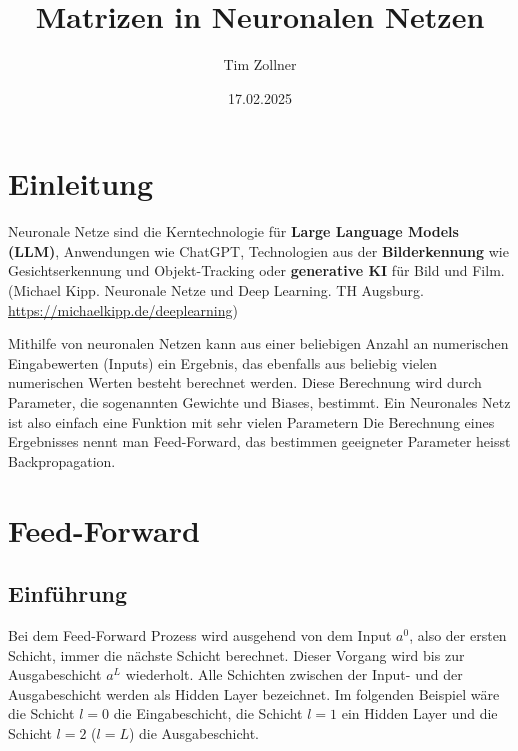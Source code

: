 \documentclass{article}
\begin{document}
\title{Matrizen in Neuronalen Netzen}
\author{Tim Zollner}
\date{17.02.2025}
\maketitle

\newpage

\section{Einleitung}
\glqq Neuronale Netze sind die Kerntechnologie für \textbf{Large Language Models (LLM)}, Anwendungen wie ChatGPT, Technologien aus der \textbf{Bilderkennung} wie Gesichtserkennung und Objekt-Tracking oder \textbf{generative KI} für Bild und Film.\grqq{}(Michael Kipp. Neuronale Netze und Deep Learning. TH Augsburg. \href{https://michaelkipp.de/deeplearning/}{https://michaelkipp.de/deeplearning})

Mithilfe von neuronalen Netzen kann aus einer beliebigen Anzahl an numerischen Eingabewerten (Inputs) ein Ergebnis,
das ebenfalls aus beliebig vielen numerischen Werten besteht berechnet werden.
Diese Berechnung wird durch Parameter, die sogenannten Gewichte und Biases, bestimmt.
Ein Neuronales Netz ist also einfach eine Funktion mit sehr vielen Parametern
Die Berechnung eines Ergebnisses nennt man Feed-Forward, das bestimmen geeigneter Parameter heisst Backpropagation.

\section{Feed-Forward}
\subsection{Einführung}
Bei dem Feed-Forward Prozess wird ausgehend von dem Input $a^0$, also der ersten Schicht, immer die nächste Schicht berechnet.
Dieser Vorgang wird bis zur Ausgabeschicht $a^L$ wiederholt.
Alle Schichten zwischen der Input- und der Ausgabeschicht werden als \glqq Hidden Layer\grqq{} bezeichnet.
Im folgenden Beispiel wäre die Schicht $l=0$ die Eingabeschicht, die Schicht $l=1$ ein \glqq Hidden Layer\grqq{} und die Schicht $l=2$ ($l=L$) die Ausgabeschicht.
\end{document}
